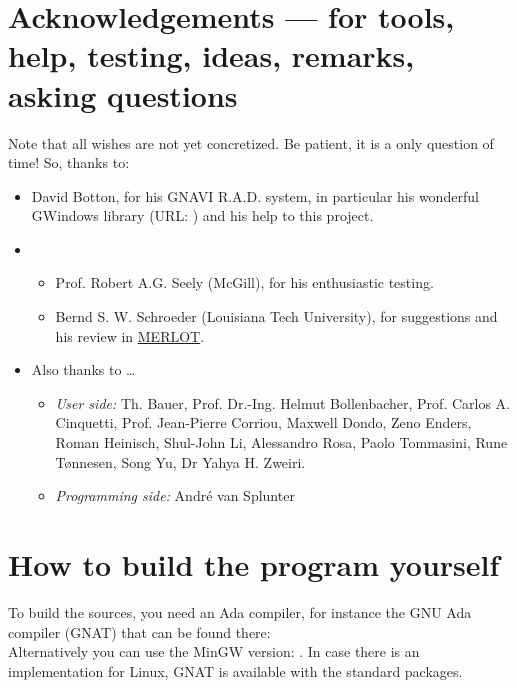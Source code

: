 \documentclass[11pt,a4paper]{article}
\begin{document}
\section{Acknowledgements --- for tools, help, testing, ideas,
remarks, asking questions}
%
Note that all wishes are not yet concretized. Be patient, it is a
only question of time! So, thanks to:
%
\begin{itemize}
  \item David Botton, for his GNAVI R.A.D. system, in
        particular his wonderful GWindows library (URL:
        )
        and his help to this project.
  \item
  \begin{itemize}
    \item
        Prof. Robert A.G. Seely (McGill), for his enthusiastic testing.
    \item
        Bernd S. W. Schroeder (Louisiana Tech University), for suggestions
        and his review in \href{http://www.merlot.org/}{MERLOT}.
  \end{itemize}
  \item Also thanks to \ldots
    \begin{itemize}
    \item {\em User side:}
        Th. Bauer,
        Prof. Dr.-Ing. Helmut Bollenbacher,
        Prof. Carlos A. Cinquetti,
        Prof. Jean-Pierre Corriou,
        Maxwell Dondo,
        Zeno Enders,
        Roman Heinisch,
        Shul-John Li,
        Alessandro Rosa,
        Paolo Tommasini,
        Rune T\o nnesen,
        Song Yu,
        Dr Yahya H. Zweiri.
    \item {\em Programming side:}
        Andr\'e van Splunter
  \end{itemize}
\end{itemize}
%
\section{How to build the program yourself}
%

To build the sources, you need an Ada compiler, for instance the
GNU Ada compiler (GNAT) that can be found there:
   \\
Alternatively you can use the MinGW version: .
In case there is an implementation for Linux, GNAT is available with
the standard packages.
  
\end{document}
